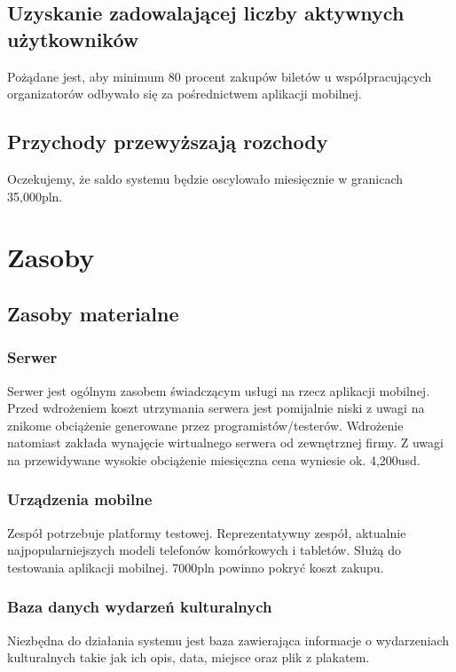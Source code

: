 \documentclass[10pt]{dokument-ppi}
\begin{document}
\subsection{Uzyskanie zadowalającej liczby aktywnych użytkowników} 
Pożądane jest, aby minimum 80 procent zakupów biletów u współpracujących organizatorów odbywało się za pośrednictwem aplikacji mobilnej.
  
\subsection{Przychody przewyższają rozchody}
Oczekujemy, że saldo systemu będzie oscylowało miesięcznie w granicach 35,000pln.

\section{Zasoby}

\subsection{Zasoby materialne}

\subsubsection{Serwer}
Serwer jest ogólnym zasobem świadczącym usługi na rzecz aplikacji mobilnej. Przed wdrożeniem koszt utrzymania serwera jest pomijalnie niski z uwagi na znikome obciążenie generowane przez programistów/testerów. Wdrożenie natomiast zakłada wynajęcie wirtualnego serwera od zewnętrznej firmy. Z uwagi na przewidywane wysokie obciążenie miesięczna cena wyniesie ok. 4,200usd.

\subsubsection{Urządzenia mobilne}
Zespół potrzebuje platformy testowej. Reprezentatywny zespół, aktualnie najpopularniejszych modeli telefonów komórkowych i tabletów. Służą do testowania aplikacji mobilnej. 7000pln powinno pokryć koszt zakupu.

\subsubsection{Baza danych wydarzeń kulturalnych}
Niezbędna do działania systemu jest baza zawierająca informacje o wydarzeniach kulturalnych takie jak ich opis, data, miejsce oraz plik z plakatem.
\end{document}
